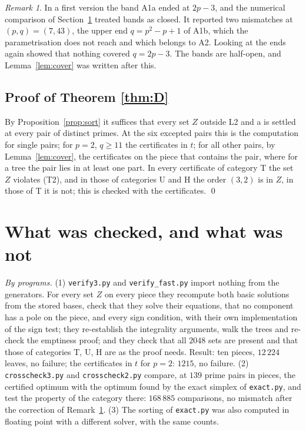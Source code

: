 \documentclass[11pt,a4paper]{amsart}
\theoremstyle{definition}
\theoremstyle{remark}
\newtheorem{remark}[theorem]{Remark}
\newcommand{\file}[1]{\texttt{#1}}
\begin{document}
\begin{remark}\label{rem:gap}
In a first version the band A1a ended at $2p-3$, and the numerical comparison of Section~\ref{sec:checks}
treated bands as closed. It reported two mismatches at $(p,q)=(7,43)$, the upper end $q=p^2-p+1$ of A1b, which
the parametrisation does not reach and which belongs to A2. Looking at the ends again showed that nothing
covered $q=2p-3$. The bands are half-open, and Lemma~\ref{lem:cover} was written after this.
\end{remark}

\subsection{Proof of Theorem \ref{thm:D}} By Proposition~\ref{prop:sort} it suffices that every set $Z$ outside
L2 and a is settled at every pair of distinct primes. At the six excepted pairs this is the computation for
single pairs; for $p=2$, $q\ge11$ the certificates in $t$; for all other pairs, by Lemma~\ref{lem:cover}, the
certificates on the piece that contains the pair, where for a tree the pair lies in at least one part. In every
certificate of category T the set $Z$ violates (T2), and in those of categories U and H the order $(3,2)$ is in
$Z$, in those of T it is not; this is checked with the certificates. \qed

\section{What was checked, and what was not}\label{sec:checks}

\emph{By programs.} (1) \file{verify3.py} and \file{verify\_fast.py} import nothing from the generators. For every
set $Z$ on every piece they recompute both basic solutions from the stored bases, check that they solve their
equations, that no component has a pole on the piece, and every sign condition, with their own implementation of
the sign test; they re-establish the integrality arguments, walk the trees and re-check the emptiness proof;
and they check that all $2048$ sets are present and that those of categories T, U, H are as the proof needs.
Result: ten pieces, $12\,224$ leaves, no failure; the certificates in $t$ for $p=2$: $1215$, no failure. (2)
\file{crosscheck3.py} and \file{crosscheck2.py} compare, at $139$ prime pairs in pieces, the certified optimum
with the optimum found by the exact simplex of \file{exact.py}, and test the property of the category there:
$168\,885$ comparisons, no mismatch after the correction of Remark~\ref{rem:gap}. (3) The sorting of
\file{exact.py} was also computed in floating point with a different solver, with the same counts.
\end{document}
